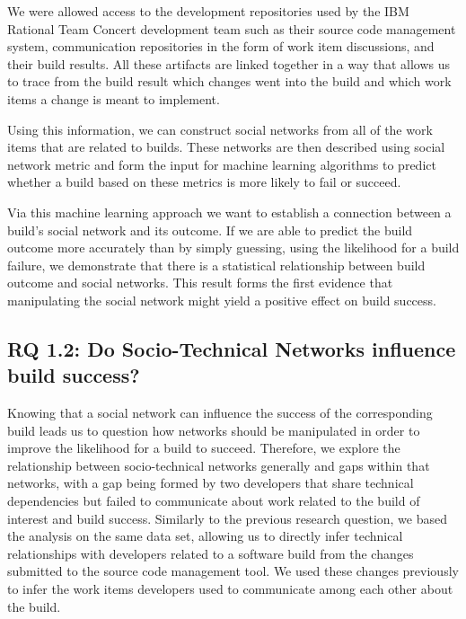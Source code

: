 We were allowed access to the development repositories used by the IBM Rational Team Concert development team such as their source code management system, communication repositories in the form of work item discussions, and their build results.
All these artifacts are linked together in a way that allows us to trace from the build result which changes went into the build and which work items a change is meant to implement.

Using this information, we can construct social networks from all of the work items that are related to builds.
These networks are then described using social network metric and form the input for machine learning algorithms to predict whether a build based on these metrics is more likely to fail or succeed.

Via this machine learning approach we want to establish a connection between a build's social network and its outcome. 
If we are able to predict the build outcome more accurately than by simply guessing, using the likelihood for a build failure, we demonstrate that there is a statistical relationship between build outcome and social networks.
This result forms the first evidence that manipulating the social network might yield a positive effect on build success.

\subsection{%
  RQ 1.2: Do Socio-Technical Networks influence build success?}

Knowing that a social network can influence the success of the corresponding build leads us to question how networks should be manipulated in order to improve the likelihood for a build to succeed.
Therefore, we explore the relationship between socio-technical networks generally and gaps within that networks, with a gap being formed by two developers that share technical dependencies but failed to communicate about work related to the build of interest and build success.
Similarly to the previous research question, we based the analysis on the same data set, allowing us to directly infer technical relationships with developers related to a software build from the changes submitted to the source code management tool.
We used these changes previously to infer the work items developers used to communicate among each other about the build.

